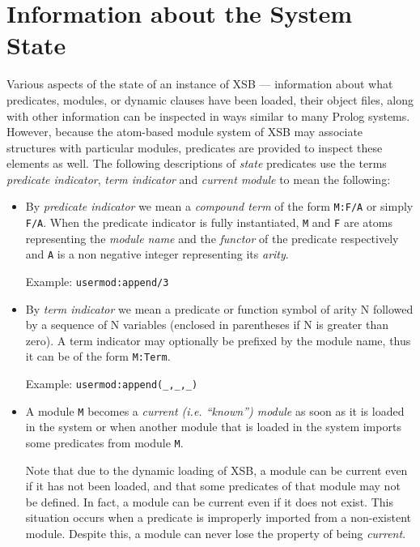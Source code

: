 \section{Information about the System State} \label{State}
 

Various aspects of the state of an instance of XSB --- information
about what predicates, modules, or dynamic clauses have been loaded,
their object files, along with other information can be inspected in
ways similar to many Prolog systems.  However, because the atom-based
module system of XSB may associate structures with particular modules,
predicates are provided to inspect these elements as well.  The
following descriptions of {\em state} predicates use the terms {\em
predicate indicator}, {\em term indicator} and {\em current module} to
mean the following:
\begin{itemize}
\item By {\em predicate indicator}  we mean a
      {\em compound term} of the form {\tt M:F/A} or simply {\tt F/A}.
      When the predicate indicator is fully instantiated, {\tt M} and {\tt F}
      are atoms representing the {\em module name} and the {\em functor} 
      of the predicate respectively and {\tt A} is a non negative integer 
      representing its {\em arity}.

      Example: {\tt usermod:append/3}
\item By {\em term indicator}  we mean a predicate or
      function symbol of arity N followed by a sequence of N variables
      (enclosed in parentheses if N is greater than zero).  A term indicator
      may optionally be prefixed by the module name, thus it can be of the
      form {\tt M:Term}.

      Example: {\tt usermod:append(\_,\_,\_)}
\item A module {\tt M} becomes a {\em current (i.e. ``known'') module} as
      soon as it is loaded in the system or when another module that is
      loaded in the system imports some predicates from module {\tt M}.

      Note that due to the dynamic loading of XSB, a module can be
      current even if it has not been loaded, and that some predicates
      of that module may not be defined. In fact, a module can be
      current even if it does not exist.  This situation occurs when a
      predicate is improperly imported from a non-existent module.
      Despite this, a module can never lose the property of being {\em
        current}.
\end{itemize}

